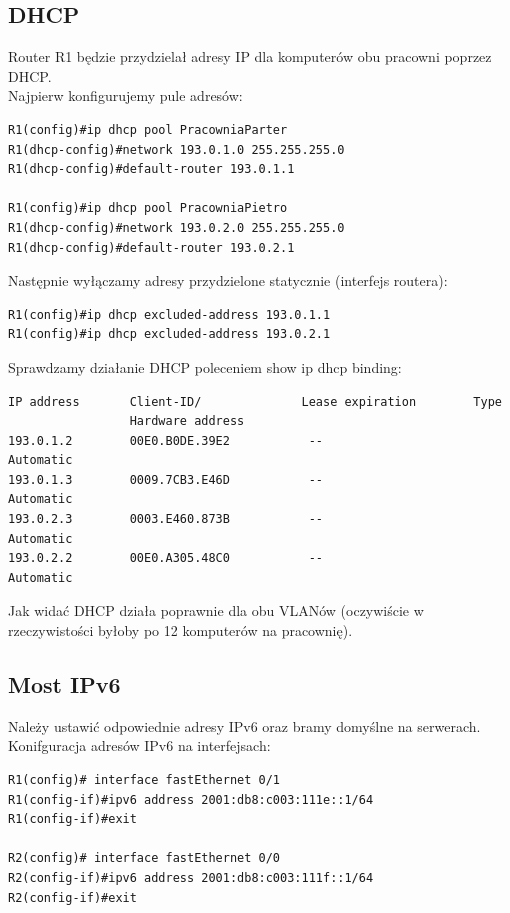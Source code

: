 \documentclass[11pt,a4paper]{article}
\begin{document}

\subsection{DHCP}
Router R1 będzie przydzielał adresy IP dla komputerów obu pracowni poprzez DHCP.\\
Najpierw konfigurujemy pule adresów:
\begin{lstlisting}
R1(config)#ip dhcp pool PracowniaParter
R1(dhcp-config)#network 193.0.1.0 255.255.255.0
R1(dhcp-config)#default-router 193.0.1.1

R1(config)#ip dhcp pool PracowniaPietro
R1(dhcp-config)#network 193.0.2.0 255.255.255.0
R1(dhcp-config)#default-router 193.0.2.1
\end{lstlisting}
Następnie wyłączamy adresy przydzielone statycznie (interfejs routera):
\begin{lstlisting}
R1(config)#ip dhcp excluded-address 193.0.1.1
R1(config)#ip dhcp excluded-address 193.0.2.1
\end{lstlisting}
Sprawdzamy działanie DHCP poleceniem show ip dhcp binding:
\begin{lstlisting}
IP address       Client-ID/              Lease expiration        Type
                 Hardware address
193.0.1.2        00E0.B0DE.39E2           --                     Automatic
193.0.1.3        0009.7CB3.E46D           --                     Automatic
193.0.2.3        0003.E460.873B           --                     Automatic
193.0.2.2        00E0.A305.48C0           --                     Automatic
\end{lstlisting}
Jak widać DHCP działa poprawnie dla obu VLANów (oczywiście w rzeczywistości byłoby po 12 komputerów na pracownię).

\subsection{Most IPv6}

\noindent
Należy ustawić odpowiednie adresy IPv6 oraz bramy domyślne na serwerach.
\noindent
Konifguracja adresów IPv6 na interfejsach:
\begin{lstlisting}
R1(config)# interface fastEthernet 0/1
R1(config-if)#ipv6 address 2001:db8:c003:111e::1/64
R1(config-if)#exit

R2(config)# interface fastEthernet 0/0
R2(config-if)#ipv6 address 2001:db8:c003:111f::1/64
R2(config-if)#exit
\end{lstlisting}
\end{document}
